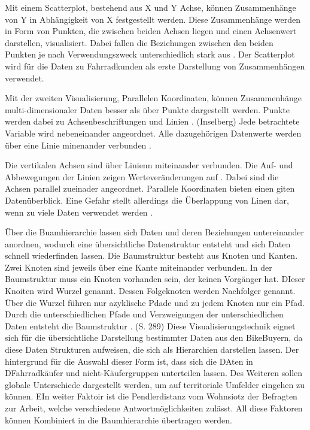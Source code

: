 \documentclass[usegeometry=true]{scrartcl}
\begin{document}
Mit einem Scatterplot, bestehend aus X und Y Achse, können Zusammenhänge von Y in Abhängigkeit von X festgestellt werden. Diese Zusammenhänge werden in Form von Punkten, die zwischen beiden Achsen liegen und einen Achsenwert darstellen, visualisiert. Dabei fallen die Beziehungen zwischen den beiden Punkten je nach  Verwendungszweck unterschiedlich stark aus \cite{Yi.16.10.2019,Anscombe.1973,Cleveland.1984}. Der Scatterplot wird für die Daten zu Fahrradkunden als erste Darstellung von Zusammenhängen verwendet. 

Mit der zweiten Visualisierung, Parallelen Koordinaten, können Zusammenhänge  multi-dimensionaler Daten besser als über Punkte dargestellt werden. Punkte werden dabei zu Achsenbeschriftungen und Linien \cite{Inselberg.1990}. (Inselberg)
Jede betrachtete Variable wird nebeneinander angeordnet. Alle dazugehörigen Datenwerte werden über eine Linie minenander verbunden \cite{Moustafa.2006}. 

Die vertikalen Achsen sind über Linienn miteinander verbunden. Die Auf- und Abbewegungen der Linien zeigen Werteveränderungen auf \cite{Few.2008}. 
Dabei sind die Achsen parallel zueinader angeordnet. Parallele Koordinaten bieten einen giten Datenüberblick. Eine Gefahr stellt allerdings die Überlappung von Linen dar, wenn zu viele Daten verwendet werden \cite{Heinrich.2009}.

Über die Buamhierarchie lassen sich Daten und deren Beziehungen untereinander anordnen, wodurch eine übersichtliche Datenstruktur entsteht und sich Daten schnell wiederfinden lassen. Die Baumstruktur besteht aus Knoten und Kanten. Zwei Knoten sind jeweils über eine Kante miteinander verbunden. In der Baumstruktur muss ein Knoten vorhanden sein, der keinen Vorgänger hat. DIeser Knoiten wird Wurzel genannt. Dessen Folgeknoten werden Nachfolger genannt. Über die Wurzel führen nur azyklische Pdade und zu jedem Knoten nur ein Pfad.  Durch die unterschiedlichen Pfade und Verzweigungen der unterschiedlichen Daten entsteht die Baumstruktur \cite{Gumm.2016}. (S. 289) Diese Visualisierungstechnik eignet sich für die übersichtliche Darstellung bestimmter Daten aus den BikeBuyern, da diese Daten Strukturen aufweisen, die sich als Hierarchien darstellen lassen.
Der hintergrund für die Auswahl dieser Form ist, dass sich die DAten in DFahrradkäufer und nicht-Käufergruppen unterteilen lassen. Des Weiteren sollen globale Unterschiede dargestellt werden, um auf territoriale Umfelder eingehen zu können. EIn weiter Faktoir ist die Pendlerdistanz vom Wohnsiotz der Befragten zur Arbeit, welche verschiedene Antwortmöglichkeiten zulässt. All diese Faktoren können Kombiniert in die Baumhierarchie übertragen werden.   
\end{document}
